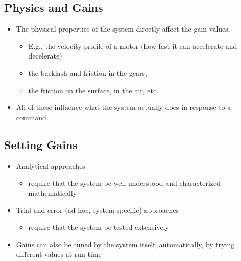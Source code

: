 \documentclass[10pt]{article}
\begin{document}
\subsection*{Physics and Gains}
\begin{itemize}
	\item The physical properties of the system directly affect the gain values.
	\begin{itemize}
        \item E.g., the velocity profile of a motor (how fast it can accelerate and decelerate)
        \item the backlash and friction in the gears,
        \item the friction on the surface, in the air, etc.
    \end{itemize}
    \item All of these influence what the system actually does in response to a command
\end{itemize}

\subsection*{Setting Gains}
\begin{itemize}
	\item Analytical approaches
	\begin{itemize}
        \item require that the system be well understood and characterized mathematically
    \end{itemize}
    \item Trial and error (ad hoc, system-specific) approaches
    \begin{itemize}
        \item require that the system be tested extensively
    \end{itemize}
    \item Gains can also be tuned by the system itself, automatically, by trying different values at run-time
\end{itemize}
\end{document}
